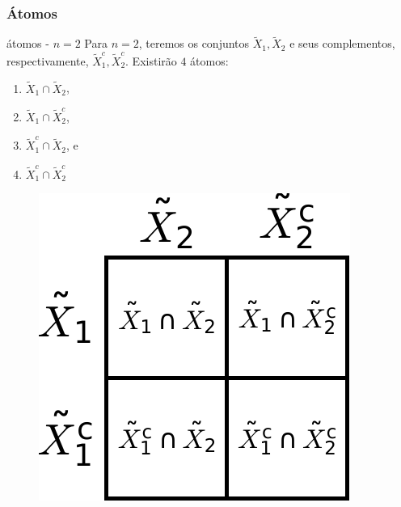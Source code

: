 \begin{frame}%
  \frametitle{Átomos}
  \begin{exampleblock}{átomos - $n=2$}
  Para $n=2$, teremos os conjuntos $\tilde{X}_1, \tilde{X}_2$ e seus complementos,
  respectivamente, $\tilde{X}_1^c, \tilde{X}_2^c$. Existirão $4$ átomos:

  \begin{minipage}[t]{0.35\linewidth}
  \begin{enumerate}
  \item $\tilde{X}_1 \cap \tilde{X}_2$,
  \item $\tilde{X}_1 \cap \tilde{X}_2^c$,
  \item $\tilde{X}_1^c \cap \tilde{X}_2$, e
  \item $\tilde{X}_1^c \cap \tilde{X}_2^c$
  \end{enumerate}
  \end{minipage} \hfill 
  \begin{minipage}[t]{0.55\linewidth}
    \begin{figure}[!ht]
    \includegraphics[width=0.5\linewidth]{images/atoms-n2.pdf}
    \end{figure}
  \end{minipage}

  \end{exampleblock}
\end{frame}

